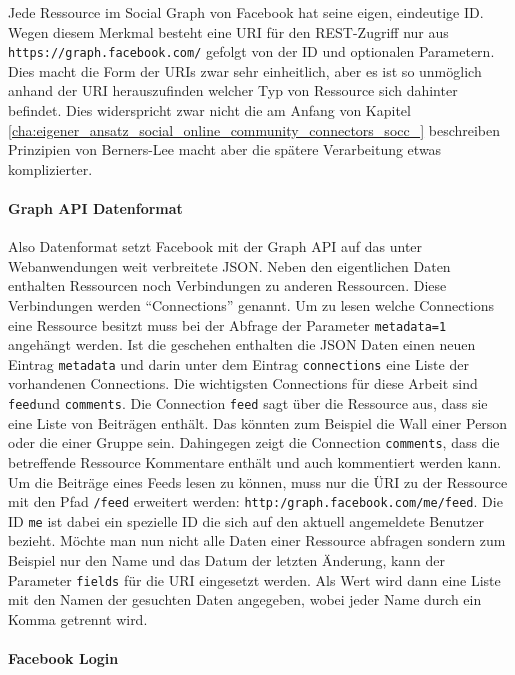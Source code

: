 Jede Ressource im Social Graph von Facebook hat seine eigen, eindeutige ID. Wegen diesem Merkmal besteht eine URI für den REST-Zugriff nur aus \texttt{https://graph.facebook.com/} gefolgt von der ID und optionalen Parametern. Dies macht die Form der URIs zwar sehr einheitlich, aber es ist so unmöglich anhand der URI herauszufinden welcher Typ von Ressource sich dahinter befindet. Dies widerspricht zwar nicht die am Anfang von Kapitel \ref{cha:eigener_ansatz_social_online_community_connectors_socc_} beschreiben Prinzipien von Berners-Lee macht aber die spätere Verarbeitung etwas komplizierter. 

\paragraph{Graph API Datenformat} %
\label{par:graph_api_datenformat}

Also Datenformat setzt Facebook mit der Graph API auf das unter Webanwendungen weit verbreitete JSON. Neben den eigentlichen Daten enthalten Ressourcen noch Verbindungen zu anderen Ressourcen. Diese Verbindungen werden \enquote{Connections} genannt. Um zu lesen welche Connections eine Ressource besitzt muss bei der Abfrage der Parameter \texttt{metadata=1} angehängt werden. Ist die geschehen enthalten die JSON Daten einen neuen Eintrag \texttt{metadata} und darin unter dem Eintrag \texttt{connections} eine Liste der vorhandenen Connections. Die wichtigsten Connections für diese Arbeit sind \texttt{feed}und \texttt{comments}. Die Connection \texttt{feed} sagt über die Ressource aus, dass sie eine Liste von Beiträgen enthält. Das könnten zum Beispiel die Wall einer Person oder die einer Gruppe sein. Dahingegen zeigt die Connection \texttt{comments}, dass die betreffende Ressource Kommentare enthält und auch kommentiert werden kann. Um die Beiträge eines Feeds lesen zu können, muss nur die ÜRI zu der Ressource mit den Pfad \texttt{/feed} erweitert werden: \texttt{http:/graph.facebook.com/me/feed}. Die ID \texttt{me} ist dabei ein spezielle ID die sich auf den aktuell angemeldete Benutzer bezieht. Möchte man nun nicht alle Daten einer Ressource abfragen sondern zum Beispiel nur den Name und das Datum der letzten Änderung, kann der Parameter \texttt{fields} für die URI eingesetzt werden. Als Wert wird dann eine Liste mit den Namen der gesuchten Daten angegeben, wobei jeder Name durch ein Komma getrennt wird. 


\paragraph{Facebook Login} %
\label{par:facebook_login}

